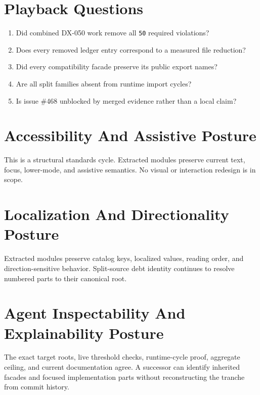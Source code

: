 \section{Playback Questions}\label{record-246-playback-questions}

\begin{enumerate}
\def\labelenumi{\arabic{enumi}.}
\tightlist
\item
  Did combined DX-050 work remove all \texttt{5\allowbreak{}0} required violations?
\item
  Does every removed ledger entry correspond to a measured file reduction?
\item
  Did every compatibility facade preserve its public export names?
\item
  Are all split families absent from runtime import cycles?
\item
  Is issue \#468 unblocked by merged evidence rather than a local claim?
\end{enumerate}

\section{Accessibility And Assistive Posture}\label{record-246-accessibility-and-assistive-posture}

This is a structural standards cycle. Extracted modules preserve current text, focus, lower-mode, and assistive semantics. No visual or interaction redesign is in scope.

\section{Localization And Directionality Posture}\label{record-246-localization-and-directionality-posture}

Extracted modules preserve catalog keys, localized values, reading order, and direction-sensitive behavior. Split-source debt identity continues to resolve numbered parts to their canonical root.

\section{Agent Inspectability And Explainability Posture}\label{record-246-agent-inspectability-and-explainability-posture}

The exact target roots, live threshold checks, runtime-cycle proof, aggregate ceiling, and current documentation agree. A successor can identify inherited facades and focused implementation parts without reconstructing the tranche from commit history.

